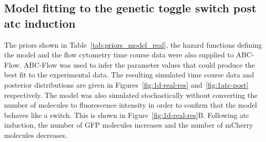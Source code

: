 \subsection{Model fitting to the genetic toggle switch post \acrshort{atc} induction}

The priors shown in Table~\ref{tab:priors_model_real}, the hazard functions defining the model and the flow cytometry time course data were also supplied to ABC-Flow. ABC-Flow was used to infer the parameter values that could produce the best fit to the experimental data. The resulting simulated time course data and posterior distributions are given in Figures~\ref{fig:1d-real-res} and~\ref{fig:1atc-post} respectively. The model was also simulated stochastically without converting the number of molecules to fluorescence intensity in order to confirm that the model behaves like a switch. This is shown in Figure~\ref{fig:1d-real-res}B. Following \acrshort{atc} induction, the number of GFP molecules increases and the number of mCherry molecules decreases. 


